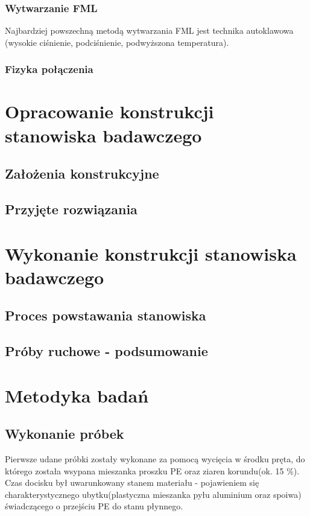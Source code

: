 \documentclass[magister,druk]{dyplom}
\begin{document}
\subsection{Wytwarzanie FML}

Najbardziej powszechną metodą wytwarzania FML jest technika autoklawowa (wysokie ciśnienie, podciśnienie, podwyższona temperatura). 

\subsection{Fizyka połączenia}

\chapter{Opracowanie konstrukcji stanowiska badawczego}
\section{Założenia konstrukcyjne}
\section{Przyjęte rozwiązania}

\chapter{Wykonanie konstrukcji stanowiska badawczego}
\section{Proces powstawania stanowiska}
\section{Próby ruchowe - podsumowanie}

\chapter{Metodyka badań}
\section{Wykonanie próbek}

Pierwsze udane próbki zostały wykonane za pomocą wycięcia w środku pręta, do którego została wsypana mieszanka proszku PE oraz ziaren korundu(ok. 15 \%). Czas docisku był uwarunkowany stanem materiału - pojawieniem się charakterystycznego ubytku(plastyczna mieszanka pyłu aluminium oraz spoiwa) świadczącego o przejściu PE do stanu płynnego. 
\end{document}
